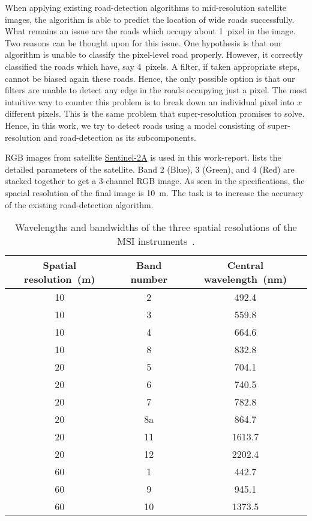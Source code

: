 When applying existing road-detection algorithms to mid-resolution satellite images, the algorithm is able to predict the location of wide roads successfully. What remains an issue are the roads which occupy about 1~pixel in the image. Two reasons can be thought upon for this issue. One hypothesis is that our algorithm is unable to classify the pixel-level road properly. However, it correctly classified the roads which have, say 4~pixels. A filter, if taken appropriate steps, cannot be biased again these roads. Hence, the only possible option is that our filters are unable to detect any edge in the roads occupying just a pixel. The most intuitive way to counter this problem is to break down an individual pixel into $x$ different pixels. This is the same problem that super-resolution promises to solve. Hence, in this work, we try to detect roads using a model consisting of super-resolution and road-detection as its subcomponents.


RGB images from satellite \href{https://sentinel.esa.int/web/sentinel/missions/sentinel-2}{Sentinel-2A} is used in this work-report.  lists the detailed parameters of the satellite. Band 2 (Blue), 3 (Green), and 4 (Red) are stacked together to get a 3-channel RGB image. As seen in the specifications, the spacial resolution of the final image is 10~m. The task is to increase the accuracy of the existing road-detection algorithm.

\begin{table}[h!]
  \centering
  \begin{tabular}{ |c|c|c| }
    \hline
    Spatial resolution~(m) & Band number & Central wavelength~(nm) \\
    \hline
    10&2&492.4 \\
    10&3&559.8 \\
    10&4&664.6 \\
    10&8&832.8 \\
    20&5&704.1 \\
    20&6&740.5 \\
    20&7&782.8 \\
    20&8a&864.7 \\
    20&11&1613.7 \\
    20&12&2202.4 \\
    60&1&442.7 \\
    60&9&945.1 \\
    60&10&1373.5 \\
    \hline
  \end{tabular}
  \caption[Wavelengths and bandwidths of the three spatial resolutions of the MSI instruments]{Wavelengths and bandwidths of the three spatial resolutions of the MSI instruments~\cite{sentinelSpecifications}.}
  \label{tab:sentinel-resolution}
\end{table}

